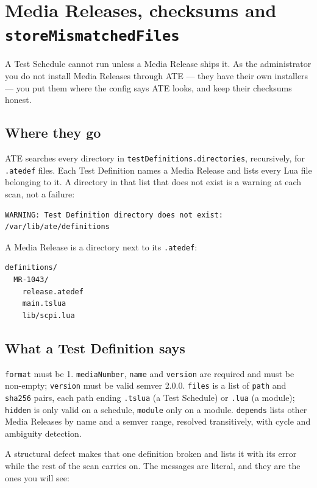 \chapter{Media Releases, checksums and \texttt{storeMismatchedFiles}}\label{ch:media-releases}

A Test Schedule cannot run unless a Media Release ships it. As the administrator you do not
install Media Releases through ATE --- they have their own installers --- you put them where the
config says ATE looks, and keep their checksums honest.

\section{Where they go}

ATE searches every directory in \texttt{testDefinitions.directories}, recursively, for
\texttt{.atedef} files. Each Test Definition names a Media Release and lists every Lua file
belonging to it. A directory in that list that does not exist is a warning at each scan, not a
failure:

\begin{lstlisting}[language=ATEShell]
WARNING: Test Definition directory does not exist: /var/lib/ate/definitions
\end{lstlisting}

A Media Release is a directory next to its \texttt{.atedef}:

\begin{lstlisting}[language=ATEShell]
definitions/
  MR-1043/
    release.atedef
    main.tslua
    lib/scpi.lua
\end{lstlisting}

\section{What a Test Definition says}

\texttt{format} must be 1. \texttt{mediaNumber}, \texttt{name} and \texttt{version} are required and
must be non-empty; \texttt{version} must be valid semver 2.0.0. \texttt{files} is a list of
\texttt{path} and \texttt{sha256} pairs, each path ending \texttt{.tslua} (a Test Schedule) or
\texttt{.lua} (a module); \texttt{hidden} is only valid on a schedule, \texttt{module} only on a
module. \texttt{depends} lists other Media Releases by name and a semver range, resolved
transitively, with cycle and ambiguity detection.

A structural defect makes that one definition broken and lists it with its error while the rest of
the scan carries on. The messages are literal, and they are the ones you will see:

